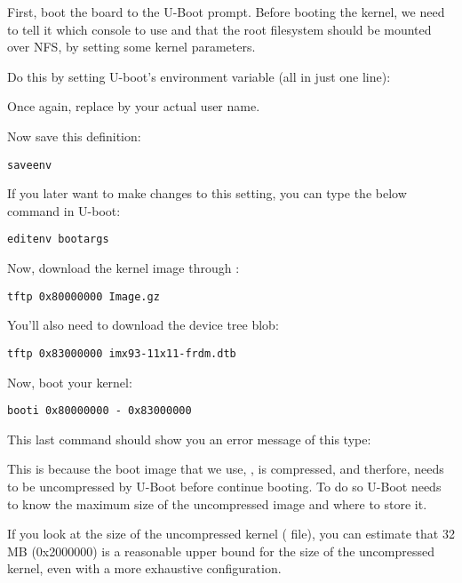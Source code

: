 First, boot the board to the U-Boot prompt. Before booting the kernel,
we need to tell it which console to use and that the root filesystem
should be mounted over NFS, by setting some kernel parameters.

Do this by setting U-boot's  environment variable (all in
just one line):


Once again, replace  by your actual user name.

Now save this definition:
\begin{verbatim}
saveenv
\end{verbatim}

If you later want to make changes to this setting, you can type the
below command in U-boot:

\begin{verbatim}
editenv bootargs
\end{verbatim}

Now, download the kernel image through :

\begin{verbatim}
tftp 0x80000000 Image.gz
\end{verbatim}

You'll also need to download the device tree blob:

\begin{verbatim}
tftp 0x83000000 imx93-11x11-frdm.dtb
\end{verbatim}

Now, boot your kernel:

\begin{verbatim}
booti 0x80000000 - 0x83000000
\end{verbatim}

This last command should show you an error message of this type:

This is because the boot image that we use, , is compressed, and
therfore, needs to be uncompressed by U-Boot before continue booting. To do so
U-Boot needs to know the maximum size of the uncompressed image and where to
store it.

If you look at the size of the uncompressed kernel ( file),
you can estimate that 32 MB (0x2000000) is a reasonable upper bound
for the size of the uncompressed kernel, even with a more exhaustive
configuration.

